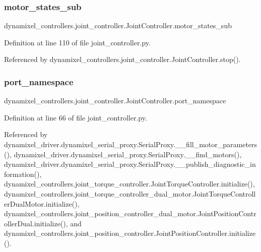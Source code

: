 \subsubsection{\texorpdfstring{motor\+\_\+states\+\_\+sub}{motor\_states\_sub}}
{\footnotesize\ttfamily dynamixel\+\_\+controllers.\+joint\+\_\+controller.\+Joint\+Controller.\+motor\+\_\+states\+\_\+sub}



Definition at line 110 of file joint\+\_\+controller.\+py.



Referenced by dynamixel\+\_\+controllers.\+joint\+\_\+controller.\+Joint\+Controller.\+stop().

\mbox{\label{classdynamixel__controllers_1_1joint__controller_1_1_joint_controller_ac89de71afa48761fb662ac2917a5b9d3}} 
\subsubsection{\texorpdfstring{port\+\_\+namespace}{port\_namespace}}
{\footnotesize\ttfamily dynamixel\+\_\+controllers.\+joint\+\_\+controller.\+Joint\+Controller.\+port\+\_\+namespace}



Definition at line 66 of file joint\+\_\+controller.\+py.



Referenced by dynamixel\+\_\+driver.\+dynamixel\+\_\+serial\+\_\+proxy.\+Serial\+Proxy.\+\_\+\+\_\+fill\+\_\+motor\+\_\+parameters(), dynamixel\+\_\+driver.\+dynamixel\+\_\+serial\+\_\+proxy.\+Serial\+Proxy.\+\_\+\+\_\+find\+\_\+motors(), dynamixel\+\_\+driver.\+dynamixel\+\_\+serial\+\_\+proxy.\+Serial\+Proxy.\+\_\+\+\_\+publish\+\_\+diagnostic\+\_\+information(), dynamixel\+\_\+controllers.\+joint\+\_\+torque\+\_\+controller.\+Joint\+Torque\+Controller.\+initialize(), dynamixel\+\_\+controllers.\+joint\+\_\+torque\+\_\+controller\+\_\+dual\+\_\+motor.\+Joint\+Torque\+Controller\+Dual\+Motor.\+initialize(), dynamixel\+\_\+controllers.\+joint\+\_\+position\+\_\+controller\+\_\+dual\+\_\+motor.\+Joint\+Position\+Controller\+Dual.\+initialize(), and dynamixel\+\_\+controllers.\+joint\+\_\+position\+\_\+controller.\+Joint\+Position\+Controller.\+initialize().

